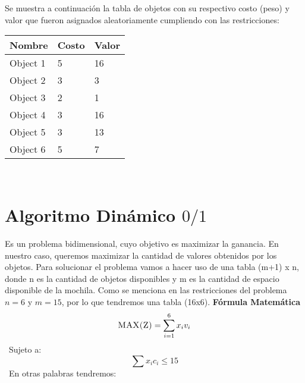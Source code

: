 \documentclass[10pt,letterpaper]{article}
\begin{document}
Se muestra a continuación la tabla de objetos con su respectivo costo (peso) y valor 
        que fueron asignados aleatoriamente cumpliendo con las restricciones: 
\begin{center}
\begin{tabu} to 0.6\textwidth { | X[l] | X[l] | X[l] | } 
\hline
{}
\textbf{Nombre} & \textbf{Costo} & \textbf{Valor}\\
\hline
Object 1 & 5 & 16 \\
\hline
Object 2 & 3 & 3 \\
\hline
Object 3 & 2 & 1 \\
\hline
Object 4 & 3 & 16 \\
\hline
Object 5 & 3 & 13 \\
\hline
Object 6 & 5 & 7 \\
\hline
\end{tabu} \\
\end{center}
\section{Algoritmo Dinámico $0/1$} 
        Es un problema bidimensional, cuyo objetivo es maximizar la ganancia. 
        En nuestro caso, queremos maximizar la cantidad de valores obtenidos por los objetos. 
        Para solucionar el problema vamos a hacer uso de una tabla (m+1) x n, donde n es la cantidad 
        de objetos disponibles y m es la cantidad de espacio disponible de la mochila. 
        Como se menciona en las restricciones del problema $n = 6$ y $m = 15$, por lo que tendremos 
        una tabla (16x6). \newline \newline \newline 
        \textbf{\Large Fórmula Matemática} 
        \[ \textsc{\normalsize MAX(Z)}\\[0.5cm] = \sum_{i=1}^{6}x_{i}v_{i} \] 
        \ Sujeto a:  
        \[ \sum x_{i}c_{i} \leq 15 \] 
        \ En otras palabras tendremos:  
        
\end{document}
